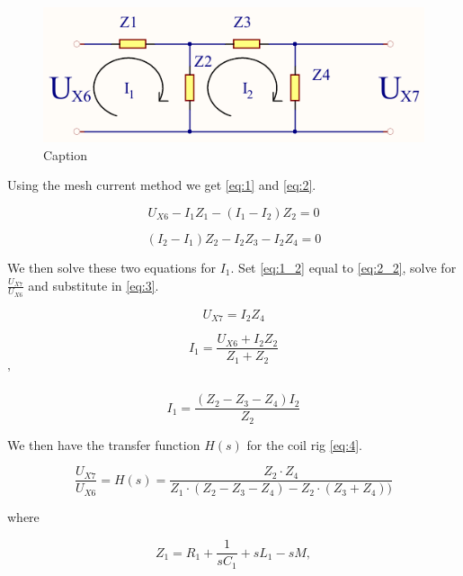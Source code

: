 \begin{figure}[h!]
    \centering
    \includegraphics[width=\textwidth]{Skjema/Spolerigg3_r.pdf}
    \caption{Caption}
    \label{fig:spolerigg3}
\end{figure}

Using the mesh current method we get \cref{eq:1} and \cref{eq:2}.

\begin{equation} \label{eq:1}
    U_{X6} - I_1 Z_1 - (I_1 - I_2) Z_2 = 0
\end{equation}

\begin{equation} \label{eq:2}
    (I_2 - I_1) Z_2 - I_2 Z_3 - I_2 Z_4 = 0
\end{equation}

We then solve these two equations for $I_1$. Set \cref{eq:1_2} equal to \cref{eq:2_2}, solve for $\frac{U_{X7}}{U_{X6}}$ and substitute in \cref{eq:3}.

\begin{equation} \label{eq:3}
    U_{X7} = I_2 Z_4
\end{equation}

\begin{equation} \label{eq:1_2}
    I_1 = \frac{U_{X6} + I_2 Z_2}{Z_1 + Z_2}
\end{equation}'

\begin{equation} \label{eq:2_2}
    I_1 = \frac{(Z_2 - Z_3 - Z_4) I_2}{Z_2}
\end{equation}

We then have the transfer function $H(s)$ for the coil rig \cref{eq:4}.

\begin{equation} \label{eq:4}
    \frac{U_{X7}}{U_{X6}} = H(s) = \frac{Z_2 \cdot Z_4}{Z_1 \cdot (Z_2 - Z_3 - Z_4) - Z_2 \cdot (Z_3 + Z_4))}
\end{equation}

where

\begin{equation} \label{eq:4_1}
    Z_1 = R_1 + \frac{1}{s C_1} + s L_1 - s M,
\end{equation}

